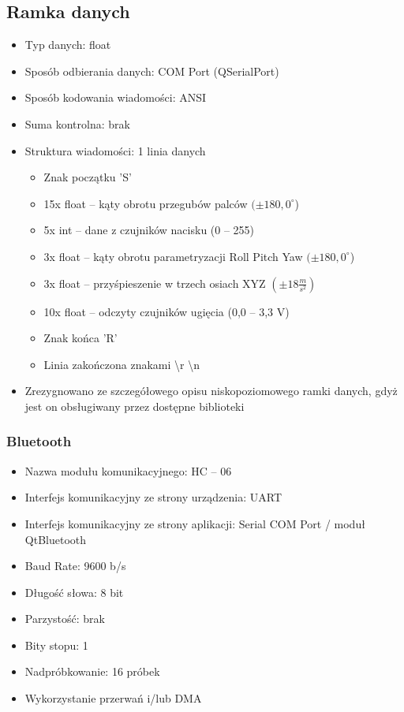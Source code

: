 \documentclass[10pt,a4paper]{article}
\begin{document}
\subsection{Ramka danych}
\begin{itemize}
\item Typ danych: float
\item Sposób odbierania danych: COM Port (QSerialPort)
\item Sposób kodowania wiadomości: ANSI
\item Suma kontrolna: brak
\item Struktura wiadomości: 1 linia danych
\begin{itemize}
\item Znak początku 'S'
\item 15x float -- kąty obrotu przegubów palców $(\pm 180,0 ^\circ$)
\item 5x int -- dane z czujników nacisku (0 -- 255)
\item 3x float -- kąty obrotu parametryzacji Roll Pitch Yaw $(\pm 180,0^\circ$)
\item 3x float -- przyśpieszenie w trzech osiach XYZ $(\pm 18 \frac{m}{s^2})$
\item 10x float -- odczyty czujników ugięcia (0,0 -- 3,3 V)
\item Znak końca 'R'
\item Linia zakończona znakami \textbackslash r \textbackslash n
\end{itemize}
\item Zrezygnowano ze szczegółowego opisu niskopoziomowego ramki danych, gdyż jest on obsługiwany przez dostępne biblioteki
\end{itemize}
\subsubsection{Bluetooth}
\begin{itemize}
\item Nazwa modułu komunikacyjnego: HC -- 06
\item Interfejs komunikacyjny ze strony urządzenia: UART
\item Interfejs komunikacyjny ze strony aplikacji: Serial COM Port / moduł QtBluetooth
\item Baud Rate: 9600 b/s
\item Długość słowa: 8 bit
\item Parzystość: brak
\item Bity stopu: 1
\item Nadpróbkowanie: 16 próbek
\item Wykorzystanie przerwań i/lub DMA
\end{itemize}
\end{document}
